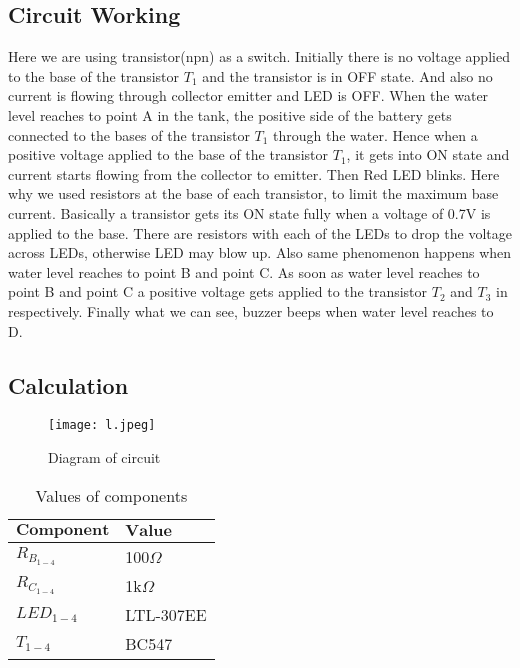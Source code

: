 \documentclass[12pt,a4paper,oneside]{book}
\theoremstyle{plain}
\numberwithin{equation}{chapter} \DeclareMathOperator{\Var}{Var}
\begin{document}
\subsection{Circuit Working}
Here we are using transistor(npn) as a switch. Initially there is no voltage applied to the base of the transistor $T_{1}$ and the transistor is in OFF state. And also no current is flowing through collector emitter and LED is OFF. When the water level reaches to point A in the tank, the positive side of the battery gets connected to the bases of the transistor $T_1$ through the water. Hence when a positive voltage applied to the base of the transistor $T_1$, it gets into ON state and current starts flowing from the collector to emitter. Then Red LED blinks. Here why we used resistors at the base of each transistor, to limit the maximum base current. Basically a transistor gets its ON state fully when a voltage of 0.7V is applied to the base. There are resistors with each of the LEDs to drop the voltage across LEDs, otherwise LED may blow up. Also same phenomenon happens when water level reaches to point B and point C. As soon as water level reaches to point B and point C a positive voltage gets applied to the transistor $T_2$ and $T_3$ in respectively. Finally what we can see, buzzer beeps when water level reaches to D.  


\subsection{Calculation}

\begin{figure}[hbt!]
    \centering
    \texttt{[image: l.jpeg]}
    \caption{Diagram of circuit}
    \label{fig:my_label}
\end{figure}

\newpage
\begin{table}[h]
\centering
\begin{tabular}{|p{4cm}|p{4cm}|}
\hline
$\textbf{Component}$ & $\textbf{Value}$ \\ \hline
		$R_{B_{1-4}}$ & 100$\Omega$\\ \hline
 		$R_{C_{1-4}}$ & 1k$\Omega$\\ \hline
		$LED_{1-4}$   & LTL-307EE\\ \hline
		$T_{1-4}$     & BC547\\ \hline
		
\end{tabular}
\caption{Values of components}
\label{tab:1}
\end{table}
\end{document}
